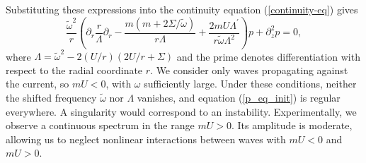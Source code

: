 \documentclass[aps,twocolumn]{revtex4-2}
\begin{document}
Substituting these expressions into the continuity equation (\ref{continuity-eq}) gives
\begin{equation}\label{p_eq_init}
	\frac{\widetilde\omega^2}{r}\left(\partial_r
	\frac{r}{\Lambda}\partial_r
	-
	\frac{m(m+2\Sigma/\widetilde \omega)}{r\Lambda}
	+
	\frac{2mU\Lambda^\prime}{r\widetilde \omega \Lambda^2}
	\right)p
	+
	\partial_z^2 p = 0,
\end{equation}
where $\Lambda = \widetilde \omega^2 - 2(U/r)(2U/r+\Sigma)$ and the prime denotes differentiation with respect to the radial coordinate $r$. We consider only waves propagating against the current, so $mU<0$, with $\omega$ sufficiently large. Under these conditions, neither the shifted frequency $\widetilde\omega$ nor $\Lambda$ vanishes, and equation (\ref{p_eq_init}) is regular everywhere. A singularity would correspond to an instability. Experimentally, we observe a continuous spectrum in the range $mU>0$. Its amplitude is moderate, allowing us to neglect nonlinear interactions between waves with $mU<0$ and $mU>0$.
\end{document}
